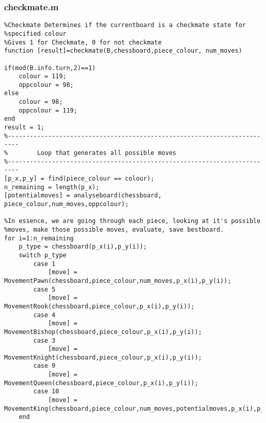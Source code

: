 \documentclass{article}
\begin{document}
\subsubsection{checkmate.m}
\begin{lstlisting}
%Checkmate Determines if the currentboard is a checkmate state for
%specified colour
%Gives 1 for Checkmate, 0 for not checkmate
function [result]=checkmate(B,chessboard,piece_colour, num_moves)

if(mod(B.info.turn,2)==1)
    colour = 119;
    oppcolour = 98;
else
    colour = 98;
    oppcolour = 119;
end
result = 1;
%-------------------------------------------------------------------------
%        Loop that generates all possible moves
%-------------------------------------------------------------------------
[p_x,p_y] = find(piece_colour == colour);
n_remaining = length(p_x);
[potentialmoves] = analyseboard(chessboard, piece_colour,num_moves,oppcolour);

%In essence, we are going through each piece, looking at it's possible
%moves, make those possible moves, evaluate, save bestboard.
for i=1:n_remaining
    p_type = chessboard(p_x(i),p_y(i));
    switch p_type
        case 1
            [move] = MovementPawn(chessboard,piece_colour,num_moves,p_x(i),p_y(i));
        case 5
            [move] = MovementRook(chessboard,piece_colour,p_x(i),p_y(i)); 
        case 4
            [move] = MovementBishop(chessboard,piece_colour,p_x(i),p_y(i));
        case 3
            [move] = MovementKnight(chessboard,piece_colour,p_x(i),p_y(i));
        case 9
            [move] = MovementQueen(chessboard,piece_colour,p_x(i),p_y(i));
        case 10
            [move] = MovementKing(chessboard,piece_colour,num_moves,potentialmoves,p_x(i),p_y(i));
    end


\end{lstlisting}
\end{document}
